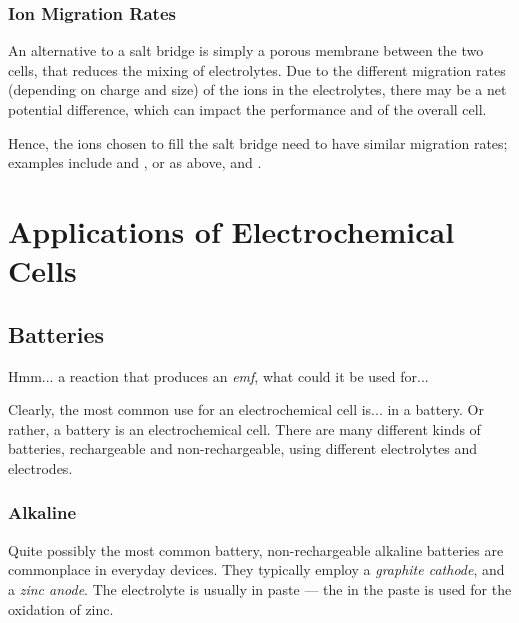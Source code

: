 			\subsubsection{Ion Migration Rates}

				An alternative to a salt bridge is simply a porous membrane between the two cells, that reduces the mixing of electrolytes.
				Due to the different migration rates (depending on charge and size) of the ions in the electrolytes, there may be a net potential
				difference, which can impact the performance and \Ecell{} of the overall cell.

				Hence, the ions chosen to fill the salt bridge need to have similar migration rates; examples include  and , or
				as above,  and \ch{\Cl-}.














	\pagebreak
	\section{Applications of Electrochemical Cells}

		\subsection{Batteries}

			Hmm... a reaction that produces an \textit{emf}, what could it be used for...

			Clearly, the most common use for an electrochemical cell is... in a battery. Or rather, a battery is an electrochemical cell.
			There are many different kinds of batteries, rechargeable and non-rechargeable, using different electrolytes and electrodes.


			\subsubsection{Alkaline}

				Quite possibly the most common battery, non-rechargeable alkaline batteries are commonplace in everyday devices. They
				typically employ a \textit{graphite cathode}, and a \textit{zinc anode}. The electrolyte is usually  in 
				paste --- the  in the paste is used for the oxidation of zinc.


